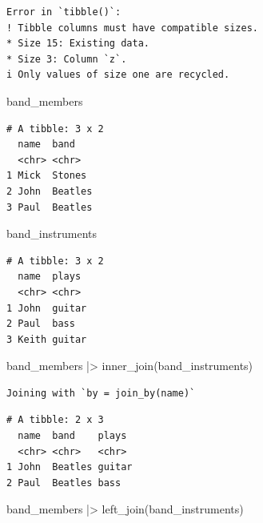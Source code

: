 \documentclass[
  letterpaper,
  DIV=11,
  numbers=noendperiod]{scrreprt}
\newenvironment{Shaded}{\begin{snugshade}}{\end{snugshade}}
\newcommand{\FunctionTok}[1]{\textcolor[rgb]{0.28,0.35,0.67}{#1}}
\newcommand{\NormalTok}[1]{\textcolor[rgb]{0.00,0.23,0.31}{#1}}
\newcommand{\SpecialCharTok}[1]{\textcolor[rgb]{0.37,0.37,0.37}{#1}}
\begin{document}
\begin{verbatim}
Error in `tibble()`:
! Tibble columns must have compatible sizes.
* Size 15: Existing data.
* Size 3: Column `z`.
i Only values of size one are recycled.
\end{verbatim}

\begin{Shaded}
\begin{Highlighting}[]
\NormalTok{band\_members}
\end{Highlighting}
\end{Shaded}

\begin{verbatim}
# A tibble: 3 x 2
  name  band   
  <chr> <chr>  
1 Mick  Stones 
2 John  Beatles
3 Paul  Beatles
\end{verbatim}

\begin{Shaded}
\begin{Highlighting}[]
\NormalTok{band\_instruments}
\end{Highlighting}
\end{Shaded}

\begin{verbatim}
# A tibble: 3 x 2
  name  plays 
  <chr> <chr> 
1 John  guitar
2 Paul  bass  
3 Keith guitar
\end{verbatim}

\begin{Shaded}
\begin{Highlighting}[]
\NormalTok{band\_members }\SpecialCharTok{|\textgreater{}} \FunctionTok{inner\_join}\NormalTok{(band\_instruments)}
\end{Highlighting}
\end{Shaded}

\begin{verbatim}
Joining with `by = join_by(name)`
\end{verbatim}

\begin{verbatim}
# A tibble: 2 x 3
  name  band    plays 
  <chr> <chr>   <chr> 
1 John  Beatles guitar
2 Paul  Beatles bass  
\end{verbatim}

\begin{Shaded}
\begin{Highlighting}[]
\NormalTok{band\_members }\SpecialCharTok{|\textgreater{}} \FunctionTok{left\_join}\NormalTok{(band\_instruments)}
\end{Highlighting}
\end{Shaded}
\end{document}

